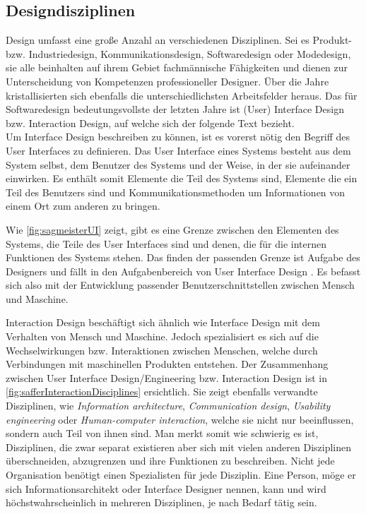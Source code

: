 \subsection{Designdisziplinen} 
Design umfasst eine große Anzahl an verschiedenen Disziplinen. Sei es Produkt- bzw. Industriedesign, Kommunikationsdesign, Softwaredesign oder Modedesign, sie alle beinhalten auf ihrem Gebiet fachmännische Fähigkeiten und dienen zur Unterscheidung von Kompetenzen professioneller Designer. Über die Jahre kristallisierten sich ebenfalls die unterschiedlichsten Arbeitsfelder heraus. Das für Softwaredesign bedeutungsvollste der letzten Jahre ist (User) Interface Design bzw. Interaction Design, auf welche sich der folgende Text bezieht.\\
Um Interface Design beschreiben zu können, ist es vorerst nötig den Begriff des User Interfaces zu definieren. Das User Interface eines Systems besteht aus dem System selbst, dem Benutzer des Systems und der Weise, in der sie aufeinander einwirken. Es enthält somit Elemente die Teil des Systems sind, Elemente die ein Teil des Benutzers sind und Kommunikationsmethoden um Informationen von einem Ort zum anderen zu bringen.

\medskip Wie \autoref{fig:sagmeisterUI} zeigt, gibt es eine Grenze zwischen den Elementen des Systems, die Teile des User Interfaces sind und	denen, die für	die	internen Funktionen des Systems stehen. Das finden der passenden Grenze ist Aufgabe des	Designers und fällt	in den Aufgabenbereich	von	User Interface Design \citep{Barfield:1993}. Es befasst sich also mit der Entwicklung passender Benutzerschnittstellen zwischen Mensch und Maschine.

\medskip Interaction Design beschäftigt sich ähnlich wie Interface Design mit dem Verhalten von Mensch und Maschine. Jedoch spezialisiert es sich auf die Wechselwirkungen bzw. Interaktionen zwischen Menschen, welche durch Verbindungen mit maschinellen Produkten entstehen. Der Zusammenhang zwischen User Interface Design/Engineering bzw. Interaction Design ist in \autoref{fig:safferInteractionDisciplines} ersichtlich. Sie zeigt ebenfalls verwandte Disziplinen, wie \emph{Information architecture}, \emph{Communication design}, \emph{Usability engineering} oder \emph{Human-computer interaction}, welche sie nicht nur beeinflussen, sondern auch Teil von ihnen sind. Man merkt somit wie schwierig es ist, Disziplinen, die zwar separat existieren aber sich mit vielen anderen Disziplinen überschneiden, abzugrenzen und ihre Funktionen zu beschreiben. Nicht jede Organisation benötigt einen Spezialisten für jede Disziplin. Eine Person, möge er sich Informationsarchitekt oder Interface Designer nennen, kann und wird höchstwahrscheinlich in mehreren Disziplinen, je nach Bedarf tätig sein. \citep{Saffer:2007}

